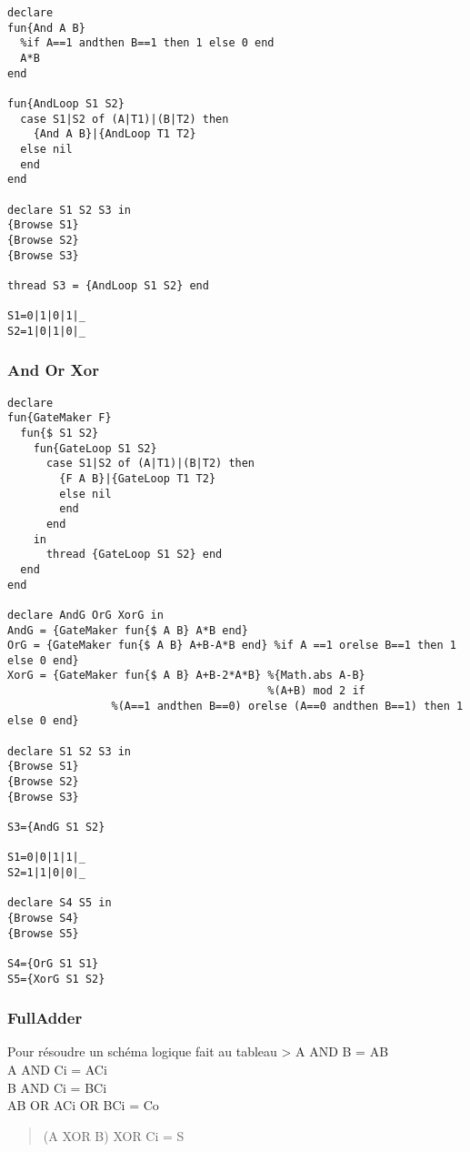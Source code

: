 \documentclass[]{article}
\begin{document}
\begin{verbatim}
declare
fun{And A B}
  %if A==1 andthen B==1 then 1 else 0 end
  A*B
end

fun{AndLoop S1 S2}
  case S1|S2 of (A|T1)|(B|T2) then
    {And A B}|{AndLoop T1 T2}
  else nil
  end
end

declare S1 S2 S3 in
{Browse S1}
{Browse S2}
{Browse S3}

thread S3 = {AndLoop S1 S2} end

S1=0|1|0|1|_
S2=1|0|1|0|_
\end{verbatim}

\hypertarget{and-or-xor}{%
\subsubsection{And Or Xor}\label{and-or-xor}}

\begin{verbatim}
declare
fun{GateMaker F}
  fun{$ S1 S2}
    fun{GateLoop S1 S2}
      case S1|S2 of (A|T1)|(B|T2) then
        {F A B}|{GateLoop T1 T2}
        else nil
        end
      end
    in
      thread {GateLoop S1 S2} end
  end
end

declare AndG OrG XorG in
AndG = {GateMaker fun{$ A B} A*B end}
OrG = {GateMaker fun{$ A B} A+B-A*B end} %if A ==1 orelse B==1 then 1 else 0 end}
XorG = {GateMaker fun{$ A B} A+B-2*A*B} %{Math.abs A-B}
                                        %(A+B) mod 2 if
                %(A==1 andthen B==0) orelse (A==0 andthen B==1) then 1 else 0 end}

declare S1 S2 S3 in
{Browse S1}
{Browse S2}
{Browse S3}

S3={AndG S1 S2}

S1=0|0|1|1|_
S2=1|1|0|0|_

declare S4 S5 in
{Browse S4}
{Browse S5}

S4={OrG S1 S1}
S5={XorG S1 S2}
\end{verbatim}

\hypertarget{fulladder}{%
\subsubsection{FullAdder}\label{fulladder}}

Pour résoudre un schéma logique fait au tableau \textgreater{} A AND B =
AB\\
A AND Ci = ACi\\
B AND Ci = BCi\\
AB OR ACi OR BCi = Co

\begin{quote}
(A XOR B) XOR Ci = S
\end{quote}
\end{document}
